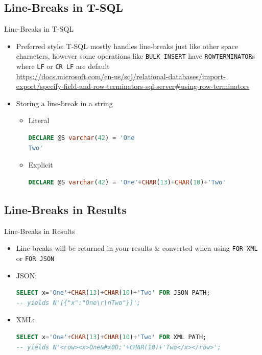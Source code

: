\documentclass[english,aspectratio=169,handout]{beamer}
\begin{document}
\subsection{Line-Breaks in T-SQL}
\begin{frame}[fragile]{Line-Breaks in T-SQL}
\begin{itemize}
\item Preferred style: T-SQL mostly handles line-breaks just like other space characters, however some operations like \texttt{BULK INSERT} have \texttt{ROWTERMINATOR}s where \texttt{LF} or \texttt{CR LF} are default\\
    \url{https://docs.microsoft.com/en-us/sql/relational-databases/import-export/specify-field-and-row-terminators-sql-server#using-row-terminators}
\item Storing a line-break in a string
    \begin{itemize}
    \item Literal \begin{lstlisting}[language=SQL]
DECLARE @S varchar(42) = 'One
Two'
    \end{lstlisting}
    \item Explicit \begin{lstlisting}[language=SQL]
DECLARE @S varchar(42) = 'One'+CHAR(13)+CHAR(10)+'Two'
    \end{lstlisting}
    \end{itemize}
\end{itemize}
\end{frame}

\subsection{Line-Breaks in Results}
\begin{frame}[fragile]{Line-Breaks in Results}
\begin{itemize}
    \item Line-breaks will be returned in your results \& converted when using \texttt{FOR XML} or \texttt{FOR JSON}
    \item JSON: \begin{lstlisting}[language=SQL]
SELECT x='One'+CHAR(13)+CHAR(10)+'Two' FOR JSON PATH;
-- yields N'[{"x":"One\r\nTwo"}]';
    \end{lstlisting}
    \item XML: \begin{lstlisting}[language=SQL]
SELECT x='One'+CHAR(13)+CHAR(10)+'Two' FOR XML PATH;
-- yields N'<row><x>One&#x0D;'+CHAR(10)+'Two</x></row>';
    \end{lstlisting}
\end{itemize}
\end{frame}
\end{document}

